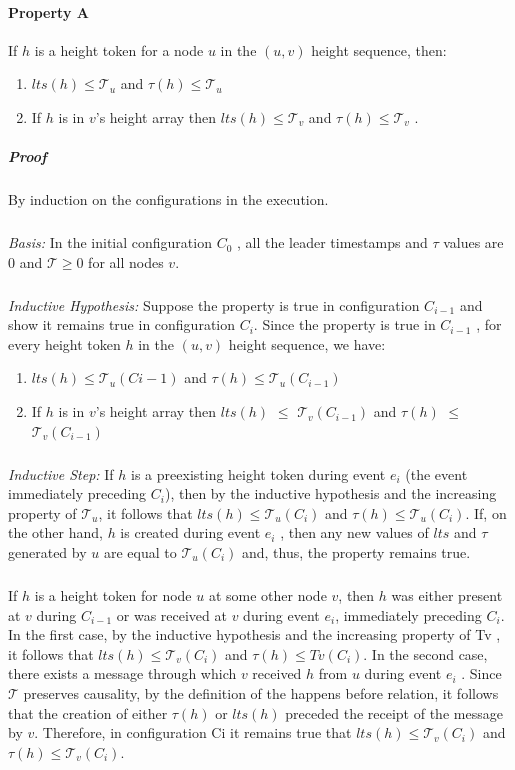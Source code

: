 \paragraph{Property A}If $h$ is a height token for a node $u$ in the $(u, v)$ height sequence, then:
\begin{enumerate}
	\item $lts(h) \leq \mathcal{T} _u$ and $\tau (h) \leq \mathcal{T} _u$
	\item If $h$ is in $v$'s height array then $lts(h) \leq \mathcal{T} _v$ and $\tau (h) \leq \mathcal{T} _v$ .
\end{enumerate}

\subparagraph{Proof}By induction on the configurations in the execution.
\subparagraph{}\textit{Basis:} In the initial configuration $C_0$ , all the leader timestamps and $\tau$ values are $0$ and $\mathcal{T} \geq 0$ for all nodes $v$.
\subparagraph{}\textit{Inductive Hypothesis:} Suppose the property is true in configuration $C_{i-1}$ and show it remains true in configuration $C_i$. Since the property is true in $C_{i-1}$ , for every height token $h$ in the $(u, v)$ height sequence, we have:
\begin{enumerate} [label=(\roman*)]
	\item $lts(h) \leq \mathcal{T} _u(Ci-1)$ and $\tau (h) \leq \mathcal{T} _u(C_{i-1})$
	\item If $h$ is in $v$'s height array then $lts(h)$ $\leq$ $\mathcal{T} _v(C_{i-1})$ and $\tau (h)$ $\leq$ $\mathcal{T} _v (C_{i-1})$
\end{enumerate}
\subparagraph{}\textit{Inductive Step:} If $h$ is a preexisting height token during event $e_i$ (the event immediately preceding $C_i$), then by the inductive hypothesis and the increasing property of $\mathcal{T} _u$, it follows that $lts(h) \leq \mathcal{T} _u (C_i)$ and $\tau (h) \leq \mathcal{T} _u(C_i)$. If, on the other hand, $h$ is created during event $e_i$ , then any new values of $lts$ and $\tau$ generated by $u$ are equal to $\mathcal{T} _u(C_i)$ and, thus, the property remains true.
\subparagraph{}If $h$ is a height token for node $u$ at some other node $v$, then $h$ was either present at $v$ during $C_{i-1}$ or was received at $v$ during event $e_i$, immediately preceding $C_i$. In the first case, by the inductive hypothesis and the increasing property of Tv , it follows that $lts(h) \leq \mathcal{T} _v (C_i)$ and $\tau (h) \leq Tv (C_i )$. In the second case, there exists a message through which $v$ received $h$ from $u$ during event $e_i$ . Since $\mathcal{T}$ preserves causality, by the definition of the happens before relation, it follows that the creation of either $\tau (h)$ or $lts(h)$ preceded the receipt of the message by $v$. Therefore, in configuration Ci it remains true that $lts(h) \leq \mathcal{T} _v (C_i)$ and $\tau (h) \leq \mathcal{T} _v (C_i)$.
